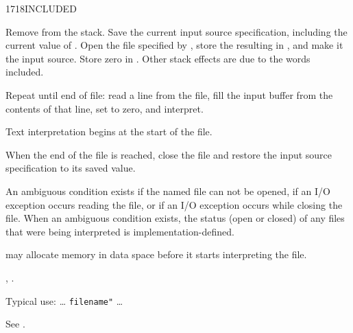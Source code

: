 \enlargethispage{-4ex}
\begin{worddef}{1718}{INCLUDED}
\item {}

	Remove  from the stack. Save the current input
	source specification, including the current value of
	. Open the file specified by ,
	store the resulting  in , and make
	it the input source. Store zero in . Other
	stack effects are due to the words included.

	Repeat until end of file: read a line from the file, fill the
	input buffer from the contents of that line, set 
	to zero, and interpret.

	Text interpretation begins at the start of the file.

	When the end of the file is reached, close the file and restore
	the input source specification to its saved value.

	An ambiguous condition exists if the named file can not be
	opened, if an I/O exception occurs reading the file, or if an
	I/O exception occurs while closing the file. When an ambiguous
	condition exists, the status (open or closed) of any files that
	were being interpreted is implementation-defined.

	 may allocate memory in data space before it
	starts interpreting the file.

\see {},
	.

	\begin{rationale} %
		Typical use:
			{\ldots}  \texttt{filename"}  {\ldots}
	\end{rationale}

	\begin{testing} %
		See .
	\end{testing}
\end{worddef}


